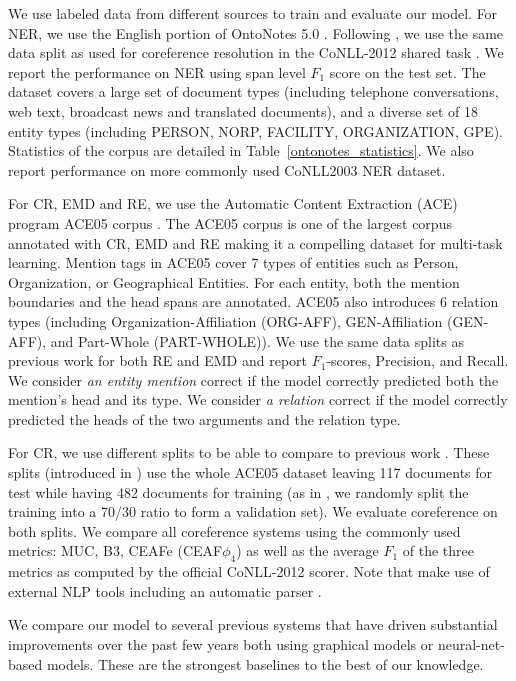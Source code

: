 \documentclass[letterpaper]{article} %
\begin{document}
We use labeled data from different sources to train and evaluate our model. For NER, we use the English portion of OntoNotes 5.0 \cite{OntoNotes2}. Following \citeauthor{Strubell2017} , we use the same data split as used for coreference resolution in the CoNLL-2012 shared task \cite{Pradhan2012Conll2012ST}. We report the performance on NER using span level $F_{1}$ score on the test set. The dataset covers a large set of document types (including telephone conversations, web text, broadcast news and translated documents), and a diverse set of 18 entity types (including PERSON, NORP, FACILITY, ORGANIZATION, GPE). Statistics of the corpus are detailed in Table~\ref{ontonotes_statistics}. We also report performance on more commonly used CoNLL2003 NER dataset.

For CR, EMD and RE, we use the Automatic Content Extraction (ACE) program ACE05 corpus \cite{ACE05}. The ACE05 corpus is one of the largest corpus annotated with CR, EMD and RE making it a compelling dataset for multi-task learning. Mention tags in ACE05 cover 7 types of entities such as Person, Organization, or Geographical Entities. For each entity, both the mention boundaries and the head spans are annotated. ACE05 also introduces 6 relation types (including Organization-Affiliation (ORG-AFF), GEN-Affiliation (GEN-AFF), and Part-Whole (PART-WHOLE)). We use the same data splits as previous work \cite{Li2014,Miwa2016,Katiyar2017} for both RE and EMD and report $F_{1}$-scores, Precision, and Recall. We consider \textit{an entity mention} correct if the model correctly predicted both the mention's head and its type. We consider \textit{a relation} correct if the model correctly predicted the heads of the two arguments and the relation type.

For CR, we use different splits to be able to compare to previous work \cite{Bansal2012,Durrett2014}. These splits (introduced in \cite{Rahman2009}) use the whole ACE05 dataset leaving 117 documents for test while having 482 documents for training (as in \cite{Bansal2012}, we randomly split the training into a 70/30 ratio to form a validation set). We evaluate coreference on both splits. We compare all  coreference systems using the commonly used metrics: MUC, B3, CEAFe (CEAF$\phi_4$) as well as the average $F_{1}$ of the three metrics as computed by the official CoNLL-2012 scorer. Note that \citeauthor{Durrett2014} make use of external NLP tools including an automatic parser \cite{Durrett13easyvictories}.

We compare our model to several previous systems that have driven substantial improvements over the past few years both using graphical models or neural-net-based models. These are the strongest baselines to the best of our knowledge.
\end{document}
